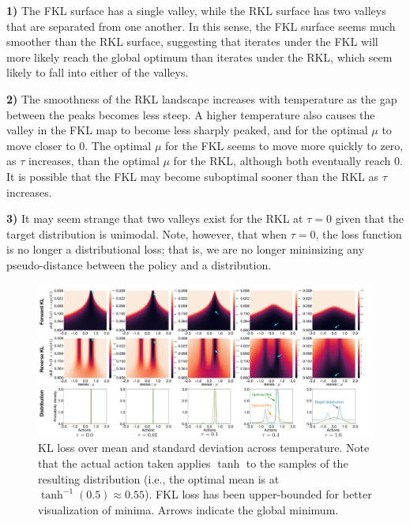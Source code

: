 \documentclass[\main/thesis.tex]{subfiles}
\begin{document}
\textbf{1)} The FKL surface has a single valley, while the RKL surface has two valleys that are separated from one another. In this sense, the FKL surface seems much smoother than the RKL surface, suggesting that iterates under the FKL will more likely reach the global optimum than iterates under the RKL, which seem likely to fall into either of the valleys. 

\textbf{2)} The smoothness of the RKL landscape increases with temperature as the gap between the peaks becomes less steep. A higher temperature also causes the valley in the FKL map to become less sharply peaked, and for the optimal $\mu$ to move closer to 0. The optimal $\mu$ for the FKL seems to move more quickly to zero, as $\tau$ increases, than the optimal $\mu$ for the RKL, although both eventually reach 0. It is possible that the FKL may become suboptimal sooner than the RKL as $\tau$ increases. 

\textbf{3)} It may seem strange that two valleys exist for the RKL at $\tau = 0$ given that the target distribution is unimodal. Note, however, that when $\tau = 0$, the loss function is no longer a distributional loss; that is, we are no longer minimizing any pseudo-distance between the policy and a distribution. 




\begin{figure}[!htb]
    \centering
    \includegraphics[width=0.99\columnwidth]{figs/bandit/trueQ/heatmaps/heatmap_combined.pdf}
    \caption{KL loss over mean and standard deviation across temperature. Note that the actual action taken applies $\tanh$ to the samples of the resulting distribution (i.e., the optimal mean is at $\tanh^{-1}(0.5) \approx 0.55$). FKL loss has been upper-bounded for better visualization of minima. Arrows indicate the global minimum.}
    \label{fig:bandit-heatmap}
\end{figure}
\end{document}
